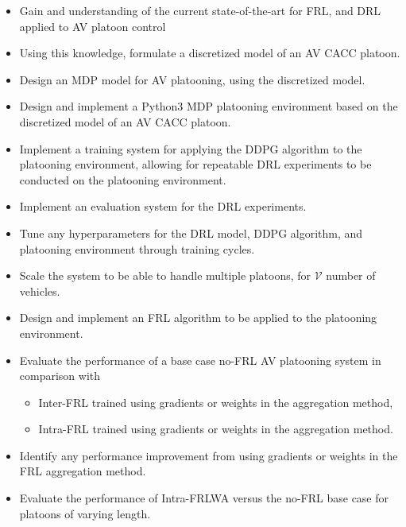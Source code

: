 \begin{itemize}
    \onehalfspacing
    \item Gain and understanding of the current state-of-the-art for FRL, and DRL
    applied to AV platoon control
    \item Using this knowledge, formulate a discretized model of an AV CACC platoon.
    \item Design an MDP model for AV platooning, using the discretized model.
    \item Design and implement a Python3 MDP platooning environment based on the discretized model of an AV
    CACC platoon.
    \item Implement a training system for applying the DDPG algorithm to the platooning
    environment, allowing for repeatable DRL experiments to be conducted on the platooning environment.
    \item Implement an evaluation system for the DRL experiments.
    \item Tune any hyperparameters for the DRL model, DDPG algorithm, and platooning environment
    through training cycles.
    \item Scale the system to be able to handle multiple platoons, for $\mathcal{V}$ number of
    vehicles.
    \item Design and implement an FRL algorithm to be applied to the platooning
    environment.
    \item Evaluate the performance of a base case no-FRL AV platooning system in
    comparison with
        \begin{itemize}
            \item Inter-FRL trained using gradients or weights in the aggregation method,
            \item Intra-FRL trained using gradients or weights in the aggregation method.
        \end{itemize}
    \item Identify any performance improvement from using gradients or weights in the
    FRL aggregation method.
    \item Evaluate the performance of Intra-FRLWA versus the no-FRL base case for
    platoons of varying length.
\end{itemize}

